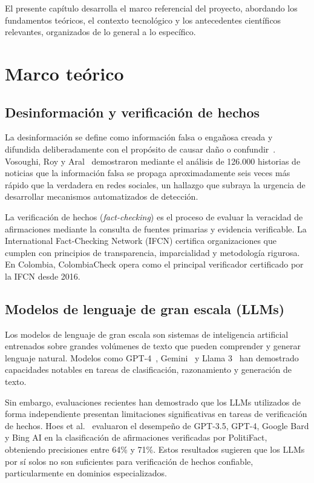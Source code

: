 El presente capítulo desarrolla el marco referencial del proyecto, abordando los fundamentos teóricos, el contexto tecnológico y los antecedentes científicos relevantes, organizados de lo general a lo específico.

\section{Marco teórico}

\subsection{Desinformación y verificación de hechos}

La desinformación se define como información falsa o engañosa creada y difundida deliberadamente con el propósito de causar daño o confundir~\cite{Lazer2018}. Vosoughi, Roy y Aral~\cite{Vosoughi2018} demostraron mediante el análisis de 126.000 historias de noticias que la información falsa se propaga aproximadamente seis veces más rápido que la verdadera en redes sociales, un hallazgo que subraya la urgencia de desarrollar mecanismos automatizados de detección.

La verificación de hechos (\textit{fact-checking}) es el proceso de evaluar la veracidad de afirmaciones mediante la consulta de fuentes primarias y evidencia verificable. La International Fact-Checking Network (IFCN) certifica organizaciones que cumplen con principios de transparencia, imparcialidad y metodología rigurosa. En Colombia, ColombiaCheck opera como el principal verificador certificado por la IFCN desde 2016.

\subsection{Modelos de lenguaje de gran escala (LLMs)}

Los modelos de lenguaje de gran escala son sistemas de inteligencia artificial entrenados sobre grandes volúmenes de texto que pueden comprender y generar lenguaje natural. Modelos como GPT-4~\cite{OpenAI2023}, Gemini~\cite{Google2024} y Llama 3~\cite{Meta2024} han demostrado capacidades notables en tareas de clasificación, razonamiento y generación de texto.

Sin embargo, evaluaciones recientes han demostrado que los LLMs utilizados de forma independiente presentan limitaciones significativas en tareas de verificación de hechos. Hoes et al.~\cite{Hoes2023} evaluaron el desempeño de GPT-3.5, GPT-4, Google Bard y Bing AI en la clasificación de afirmaciones verificadas por PolitiFact, obteniendo precisiones entre 64\% y 71\%. Estos resultados sugieren que los LLMs por sí solos no son suficientes para verificación de hechos confiable, particularmente en dominios especializados.

